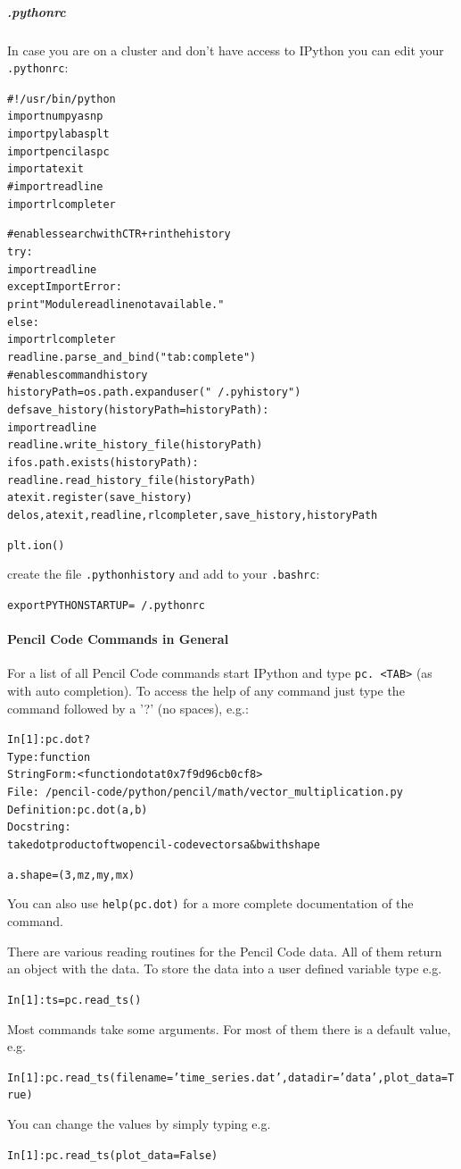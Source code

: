 \documentclass[\mydriver,12pt,twoside,notitlepage,a4paper]{article}
\begin{document}
\subparagraph{.pythonrc}
In case you are on a cluster and don't have access to
IPython you can edit your \texttt{.pythonrc}:
\begin{alltt}
#!/usr/bin/python
import numpy as np
import pylab as plt
import pencil as pc
import atexit
#import readline
import rlcompleter

# enables search with CTR+r in the history
try:
    import readline
except ImportError:
    print "Module readline not available."
else:
    import rlcompleter
    readline.parse_and_bind("tab: complete")
# enables command history
historyPath = os.path.expanduser("~/.pyhistory")
def save_history(historyPath=historyPath):
    import readline
    readline.write_history_file(historyPath)
if os.path.exists(historyPath):
    readline.read_history_file(historyPath)
atexit.register(save_history)
del os, atexit, readline, rlcompleter, save_history, historyPath

plt.ion()
\end{alltt}
create the file \texttt{.pythonhistory} and add to your \texttt{.bashrc}:
\begin{alltt}
export PYTHONSTARTUP=~/.pythonrc
\end{alltt}

\paragraph{Pencil Code Commands in General}
For a list of all Pencil Code commands start IPython and type
\texttt{pc. <TAB>} (as with auto completion).
To access the help of any command just type the command followed by a '?'
(no spaces), e.g.:
\begin{alltt}
In [1]: pc.dot?
Type:       function
String Form:<function dot at 0x7f9d96cb0cf8>
File:       ~/pencil-code/python/pencil/math/vector_multiplication.py
Definition: pc.dot(a, b)
Docstring:
take dot product of two pencil-code vectors a & b with shape

a.shape = (3,mz,my,mx)
\end{alltt}
You can also use \texttt{help(pc.dot)} for a more complete documentation of the command.

There are various reading routines for the Pencil Code data.
All of them return an object with the data.
To store the data into a user defined variable type e.g.
\begin{alltt}
In [1]: ts = pc.read_ts()
\end{alltt}

Most commands take some arguments.
For most of them there is a default value, e.g.
\begin{alltt}
In [1]: pc.read_ts(filename='time_series.dat', datadir='data', plot_data=True)
\end{alltt}
You can change the values by simply typing e.g.
\begin{alltt}
In [1]: pc.read_ts(plot_data = False)
\end{alltt}
\end{document}
